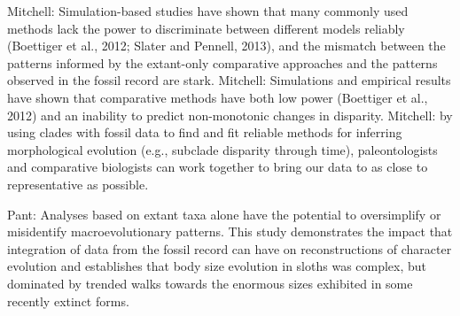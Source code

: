 Mitchell: Simulation-based studies have shown that many commonly used methods lack the power to discriminate between different models reliably (Boettiger et al., 2012; Slater and Pennell, 2013), and the mismatch between the patterns informed by the extant-only comparative approaches and the patterns observed in the fossil record are stark.
Mitchell: Simulations and empirical results have shown that comparative methods have both low power (Boettiger et al., 2012) and an inability to predict non-monotonic changes in disparity.
Mitchell: by using clades with fossil data to find and fit reliable methods for inferring morphological evolution (e.g., subclade disparity through time), paleontologists and comparative biologists can work together to bring our data to as close to representative as possible.

Pant: Analyses based on extant taxa alone have the potential to oversimplify or misidentify macroevolutionary patterns. This study demonstrates the impact that integration of data from the fossil record can have on reconstructions of character evolution and establishes that body size evolution in sloths was complex, but dominated by trended walks towards the enormous sizes exhibited in some recently extinct forms.

